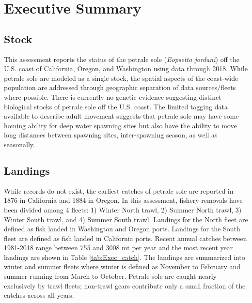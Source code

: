 \documentclass[12pt,]{article}
\begin{document}
\vspace{3cm}



\maketitle


\setcounter{page}{1}

{
\setcounter{tocdepth}{4}
\tableofcontents
}
\setlength{\parskip}{5mm plus1mm minus1mm} \pagebreak

\setcounter{page}{1} \renewcommand{\thefigure}{\alph{figure}}
\renewcommand{\thetable}{\alph{table}}

\section*{Executive Summary}\label{executive-summary}

\subsection*{Stock}\label{stock}

This assessment reports the status of the petrale sole
(\emph{Eopsetta jordani}) off the U.S. coast of California, Oregon, and
Washington using data through 2018. While petrale sole are modeled as a
single stock, the spatial aspects of the coast-wide population are
addressed through geographic separation of data sources/fleets where
possible. There is currently no genetic evidence suggesting distinct
biological stocks of petrale sole off the U.S. coast. The limited
tagging data available to describe adult movement suggests that petrale
sole may have some homing ability for deep water spawning sites but also
have the ability to move long distances between spawning sites,
inter-spawning season, as well as seasonally.

\subsection*{Landings}\label{landings}

While records do not exist, the earliest catches of petrale sole are
reported in 1876 in California and 1884 in Oregon. In this assessment,
fishery removals have been divided among 4 fleets: 1) Winter North
trawl, 2) Summer North trawl, 3) Winter South trawl, and 4) Summer South
trawl. Landings for the North fleet are defined as fish landed in
Washington and Oregon ports. Landings for the South fleet are defined as
fish landed in California ports. Recent annual catches between 1981-2018
range between 755 and 3008 mt per year and the most recent year landings
are shown in Table \ref{tab:Exec_catch}. The landings are summarized
into winter and summer fleets where winter is defined as November to
February and summer running from March to October. Petrale sole are
caught nearly exclusively by trawl fleets; non-trawl gears contribute
only a small fraction of the catches across all years.
\end{document}
